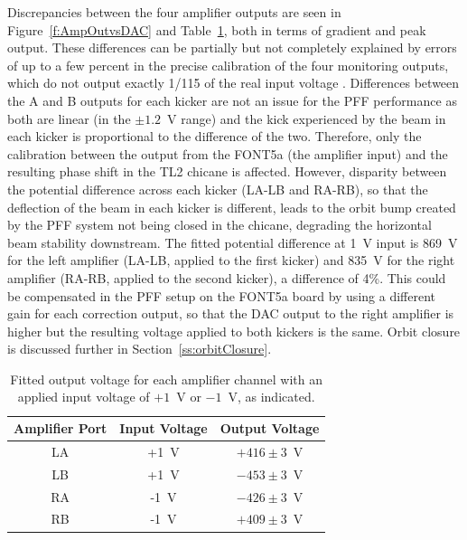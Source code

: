 Discrepancies between the four amplifier outputs are seen in Figure~\ref{f:AmpOutvsDAC} and Table~\ref{t:AmpOutVsDAC}, both in terms of gradient and peak output. These differences can be partially but not completely explained by errors of up to a few percent in the precise calibration of the four monitoring outputs, which do not output exactly 1/115 of the real input voltage \cite{colinPriv}. Differences between the A and B outputs for each kicker are not an issue for the PFF performance as both are linear (in the \(\pm1.2\)~V range) and the kick experienced by the beam in each kicker is proportional to the difference of the two. Therefore, only the calibration between the output from the FONT5a (the amplifier input) and the resulting phase shift in the TL2 chicane is affected. However, disparity between the potential difference across each kicker (LA-LB and RA-RB), so that the deflection of the beam in each kicker is different, leads to the orbit bump created by the PFF system not being closed in the chicane, degrading the horizontal beam stability downstream. The fitted potential difference at 1~V input is 869~V for the left amplifier (LA-LB, applied to the first kicker) and 835~V for the right amplifier (RA-RB, applied to the second kicker), a difference of 4\%. This could be compensated in the PFF setup on the FONT5a board by using a different gain for each correction output, so that the DAC output to the right amplifier is higher but the resulting voltage applied to both kickers is the same. Orbit closure is discussed further in Section~\ref{ss:orbitClosure}.

\begin{table}
  \begin{center}
    \begin{tabular}{| c c c |}
	   \hline
       Amplifier Port & Input Voltage & Output Voltage \\ \hline
       LA & +1~V & \(+416\pm3\)~V \\
	   LB & +1~V & \(-453\pm3\)~V \\
	   RA & -1~V & \(-426\pm3\)~V \\
	   RB & -1~V & \(+409\pm3\)~V \\
 	   \hline
    \end{tabular}
    \caption{Fitted output voltage for each amplifier channel with an applied input voltage of \(+1\)~V or \(-1\)~V, as indicated.}
  	\label{t:AmpOutVsDAC}
  \end{center}
\end{table}

